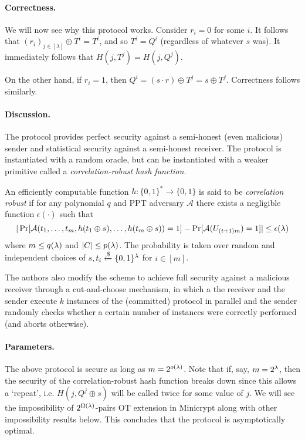 \paragraph{Correctness.} We will now see why this protocol works. Consider $r_i = 0$ for some $i$. It follows that $(r_i)_{j\in[\lambda]}\oplus T^i = T^i$, and so $T^i=Q^i$ (regardless of whatever $s$ was). It immediately follows that $H(j, T^j) = H(j, Q^j)$.

On the other hand, if $r_i = 1$, then $Q^i = (s \cdot r)\oplus T^j =s\oplus  T^j$. Correctness follows similarly.

\paragraph{Discussion.} The protocol provides perfect security against a semi-honest (even malicious) sender and statistical security against a semi-honest receiver. The protocol is instantiated with a random oracle, but can be instantiated with a weaker primitive called a \textit{correlation-robust hash function}.

\begin{definition}
	An efficiently computable function $h:\{0,1\}^{*}\rightarrow \{0,1\}$ is said to be \textit{correlation robust} if for any polynomial $q$ and PPT adversary $\mathcal{A}$ there exists a negligible function $\epsilon(\cdot)$ such that
	$$|\Pr[\mathcal{A}(t_1,\dots,t_m, h(t_1\oplus s), \dots, h(t_m\oplus s))=1]-\Pr[\mathcal{A}(U_{(t+1)m})=1]|\leq\epsilon(\lambda)$$
	where $m\leq q(\lambda)$ and $|C|\leq p(\lambda)$. The probability is taken over random and independent choices of $s, t_i\xleftarrow{\$}\{0,1\}^\lambda$ for $i\in[m]$.
\end{definition}

The authors also modify the scheme to achieve full security against a malicious receiver through a cut-and-choose mechanism, in which a the receiver and the sender execute $k$ instances of the (committed) protocol in parallel and the sender randomly checks whether a certain number of instances were correctly performed (and aborts otherwise).

\paragraph{Parameters.} The above protocol is secure as long as $m=2^{o(\lambda)}$. Note that if, say, $m = 2^\lambda$, then the security of the correlation-robust hash function breaks down since this allows a `repeat', i.e. $H(j, Q^j\oplus s)$ will be called twice for some value of $j$. We will see the impossibility of $2^{\Omega(\lambda)}$-pairs OT extension in Minicrypt along with other impossibility results below. This concludes that the protocol is asymptotically optimal.

